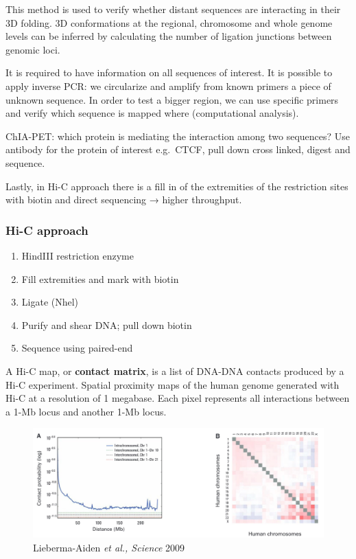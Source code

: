 This method is used to verify whether distant sequences are interacting in their 3D folding. 3D conformations at the regional, chromosome and whole genome levels can be inferred by calculating the number of ligation junctions between genomic loci.

It is required to have information on all sequences of interest. It is possible to apply inverse PCR: we circularize and amplify from known primers a piece of unknown sequence. In order to test a bigger region, we can use specific primers and verify which sequence is mapped where (computational analysis).

ChIA-PET: which protein is mediating the interaction among two sequences? Use antibody for the protein of interest e.g.~CTCF, pull down cross linked, digest and sequence.

Lastly, in Hi-C approach there is a fill in of the extremities of the restriction sites with biotin and direct sequencing → higher throughput.

\hypertarget{hi-c-approach}{%
\subsubsection{Hi-C approach}\label{hi-c-approach}}

\begin{enumerate}
\def\labelenumi{\arabic{enumi}.}
\tightlist
\item
  HindIII restriction enzyme
\item
  Fill extremities and mark with biotin
\item
  Ligate (Nhel)
\item
  Purify and shear DNA; pull down biotin
\item
  Sequence using paired-end
\end{enumerate}

A Hi-C map, or \textbf{contact matrix}, is a list of DNA-DNA contacts produced by a Hi-C experiment. Spatial proximity maps of the human genome generated with Hi-C at a resolution of 1 megabase. Each pixel represents all interactions between a 1-Mb locus and another 1-Mb locus.

\begin{figure}
\centering
\includegraphics[width=\textwidth]{../_resources/Screenshot_2022-10-25_at_11-47-30.png}
\caption{Lieberma-Aiden \emph{et al., Science} 2009}
\end{figure}

